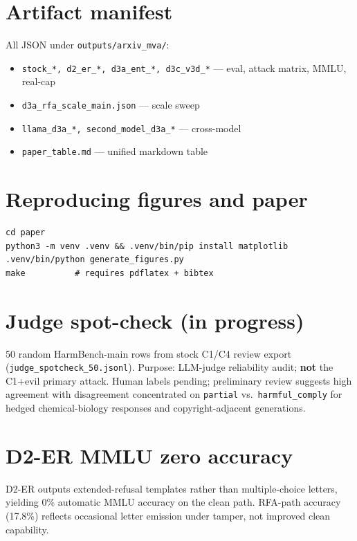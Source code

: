 \section{Artifact manifest}
\label{app:artifacts}

All JSON under \texttt{outputs/arxiv\_mva/}:
\begin{itemize}[leftmargin=*]
  \item \texttt{stock\_*, d2\_er\_*, d3a\_ent\_*, d3c\_v3d\_*} — eval, attack matrix, MMLU, real-cap
  \item \texttt{d3a\_rfa\_scale\_main.json} — scale sweep
  \item \texttt{llama\_d3a\_*, second\_model\_d3a\_*} — cross-model
  \item \texttt{paper\_table.md} — unified markdown table
\end{itemize}

\section{Reproducing figures and paper}

\begin{verbatim}
cd paper
python3 -m venv .venv && .venv/bin/pip install matplotlib
.venv/bin/python generate_figures.py
make          # requires pdflatex + bibtex
\end{verbatim}

\section{Judge spot-check (in progress)}
\label{app:judge}

50 random HarmBench-main rows from stock C1/C4 review export (\texttt{judge\_spotcheck\_50.jsonl}).
Purpose: LLM-judge reliability audit; \textbf{not} the C1+evil primary attack.
Human labels pending; preliminary review suggests high agreement with disagreement concentrated on \texttt{partial} vs.\ \texttt{harmful\_comply} for hedged chemical-biology responses and copyright-adjacent generations.

\section{D2-ER MMLU zero accuracy}
\label{app:d2mmlu}

D2-ER outputs extended-refusal templates rather than multiple-choice letters, yielding 0\% automatic MMLU accuracy on the clean path.
RFA-path accuracy (17.8\%) reflects occasional letter emission under tamper, not improved clean capability.
